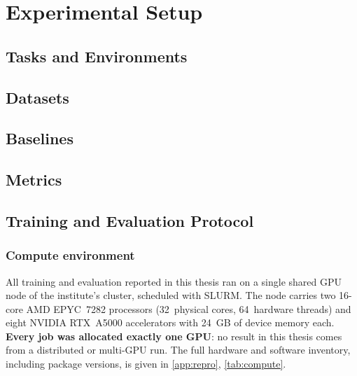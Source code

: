 \chapter{Experimental Setup}\label{ch:setup}
\section{Tasks and Environments}\label{sec:setup:tasks}
\section{Datasets}\label{sec:setup:data}
\section{Baselines}\label{sec:setup:baselines}
\section{Metrics}\label{sec:setup:metrics}
\section{Training and Evaluation Protocol}\label{sec:setup:protocol}


\subsection*{Compute environment}

All training and evaluation reported in this thesis ran on a single shared GPU node of the
institute's cluster, scheduled with SLURM. The node carries two 16-core AMD EPYC~7282 processors
(32~physical cores, 64~hardware threads) and eight NVIDIA RTX~A5000 accelerators with 24~GB of
device memory each. \textbf{Every job was allocated exactly one GPU}: no result in this thesis comes
from a distributed or multi-GPU run. The full hardware and software inventory, including package
versions, is given in \autoref{app:repro}, \autoref{tab:compute}.


